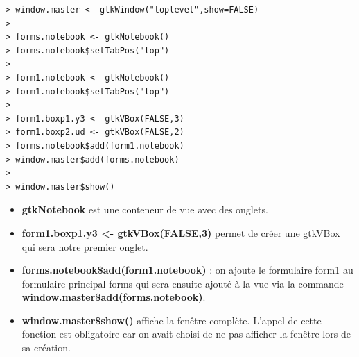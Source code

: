 \begin{lstlisting}
> window.master <- gtkWindow("toplevel",show=FALSE)
> 
> forms.notebook <- gtkNotebook()
> forms.notebook$setTabPos("top")
> 
> form1.notebook <- gtkNotebook()
> form1.notebook$setTabPos("top")
> 
> form1.boxp1.y3 <- gtkVBox(FALSE,3)
> form1.boxp2.ud <- gtkVBox(FALSE,2)
> forms.notebook$add(form1.notebook)
> window.master$add(forms.notebook)
> 
> window.master$show()

\end{lstlisting}

\begin{itemize}
\item \textbf{gtkNotebook} est une conteneur de vue avec des onglets. \\
\item \textbf{form1.boxp1.y3 <- gtkVBox(FALSE,3)} permet de créer une gtkVBox qui sera notre premier onglet. \\
\item \textbf{forms.notebook\$add(form1.notebook)} : on ajoute le formulaire form1 au formulaire principal forms qui sera ensuite ajouté à la vue via la commande \textbf{window.master\$add(forms.notebook)}. \\
\item \textbf{window.master\$show()} affiche la fenêtre complète. L'appel de cette fonction est obligatoire car on avait choisi de ne pas afficher la fenêtre lors de sa création. 
\end{itemize}




